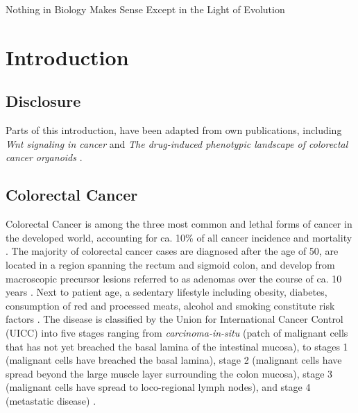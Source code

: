 \begin{savequote}[75mm]
Nothing in Biology Makes Sense Except in the Light of Evolution
\end{savequote}

\chapter{Introduction}
\label{introduction}
\begin{flushleft}
\setlength{\parindent}{7ex}
\section{Disclosure}
Parts of this introduction, have been adapted from own publications, including \textit{Wnt signaling in cancer} \citep{zhanWntSignalingCancer2017} and \textit{The drug-induced phenotypic landscape of colorectal cancer organoids} \citep{betgeDruginducedPhenotypicLandscape2022}.

\section{Colorectal Cancer}
Colorectal Cancer is among the three most common and lethal forms of cancer in the developed world, accounting for ca. 10\% of all cancer incidence and mortality \citep{sungGlobalCancerStatistics2021}. The majority of colorectal cancer cases are diagnosed after the age of 50, are located in a region spanning the rectum and sigmoid colon, and develop from macroscopic precursor lesions referred to as adenomas over the course of ca. 10 years \citep{choGeneticAlterationsAdenoma1992}. Next to patient age, a sedentary lifestyle including obesity, diabetes, consumption of red and processed meats, alcohol and smoking constitute risk factors \citep{sungGlobalCancerStatistics2021}. The disease is classified by the Union for International Cancer Control (UICC) into five stages ranging from \textit{carcinoma-in-situ} (patch of malignant cells that has not yet breached the basal lamina of the intestinal mucosa), to stages 1 (malignant cells have breached the basal lamina), stage 2 (malignant cells have spread beyond the large muscle layer surrounding the colon mucosa), stage 3 (malignant cells have spread to loco-regional lymph nodes), and stage 4 (metastatic disease) \citep{vancutsemESMOConsensusGuidelines2016a}.
\par


\end{flushleft}
